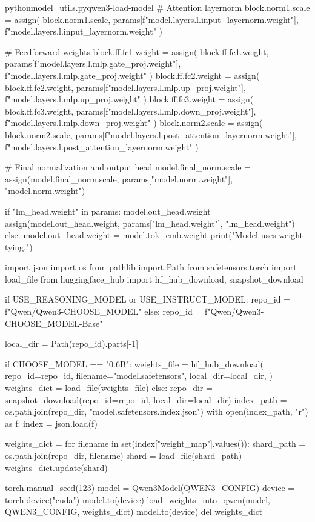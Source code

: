 \documentclass[lang=cn,newtx,10pt,scheme=chinese]{elegantbook}
\begin{document}
\begin{codebox}{python}{model\_utils.py}{qwen3-load-model}
        # Attention layernorm
        block.norm1.scale = assign(
            block.norm1.scale,
            params[f"model.layers.{l}.input_layernorm.weight"],
            f"model.layers.{l}.input_layernorm.weight"
        )

        # Feedforward weights
        block.ff.fc1.weight = assign(
            block.ff.fc1.weight,
            params[f"model.layers.{l}.mlp.gate_proj.weight"],
            f"model.layers.{l}.mlp.gate_proj.weight"
        )
        block.ff.fc2.weight = assign(
            block.ff.fc2.weight,
            params[f"model.layers.{l}.mlp.up_proj.weight"],
            f"model.layers.{l}.mlp.up_proj.weight"
        )
        block.ff.fc3.weight = assign(
            block.ff.fc3.weight,
            params[f"model.layers.{l}.mlp.down_proj.weight"],
            f"model.layers.{l}.mlp.down_proj.weight"
        )
        block.norm2.scale = assign(
            block.norm2.scale,
            params[f"model.layers.{l}.post_attention_layernorm.weight"],
            f"model.layers.{l}.post_attention_layernorm.weight"
        )

    # Final normalization and output head
    model.final_norm.scale = assign(model.final_norm.scale, params["model.norm.weight"], "model.norm.weight")

    if "lm_head.weight" in params:
        model.out_head.weight = assign(model.out_head.weight, params["lm_head.weight"], "lm_head.weight")
    else:
        model.out_head.weight = model.tok_emb.weight
        print("Model uses weight tying.")

import json
import os
from pathlib import Path
from safetensors.torch import load_file
from huggingface_hub import hf_hub_download, snapshot_download


if USE_REASONING_MODEL or USE_INSTRUCT_MODEL:
    repo_id = f"Qwen/Qwen3-{CHOOSE_MODEL}"
else:
    repo_id = f"Qwen/Qwen3-{CHOOSE_MODEL}-Base"

local_dir = Path(repo_id).parts[-1]

if CHOOSE_MODEL == "0.6B":
    weights_file = hf_hub_download(
        repo_id=repo_id,
        filename="model.safetensors",
        local_dir=local_dir,
    )
    weights_dict = load_file(weights_file)
else:
    repo_dir = snapshot_download(repo_id=repo_id, local_dir=local_dir)
    index_path = os.path.join(repo_dir, "model.safetensors.index.json")
    with open(index_path, "r") as f:
        index = json.load(f)

    weights_dict = {}
    for filename in set(index["weight_map"].values()):
        shard_path = os.path.join(repo_dir, filename)
        shard = load_file(shard_path)
        weights_dict.update(shard)

torch.manual_seed(123)
model = Qwen3Model(QWEN3_CONFIG)
device = torch.device("cuda")
model.to(device)
load_weights_into_qwen(model, QWEN3_CONFIG, weights_dict)
model.to(device)
del weights_dict
\end{codebox}
\end{document}
